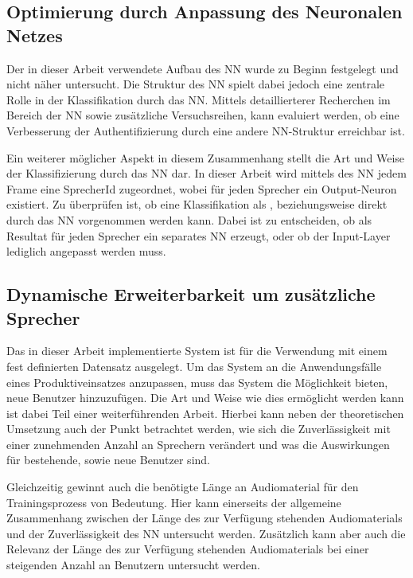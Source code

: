 \subsection{Optimierung durch Anpassung des Neuronalen Netzes}
Der in dieser Arbeit verwendete Aufbau des \ac{NN} wurde zu Beginn festgelegt und nicht näher untersucht.
Die Struktur des \ac{NN} spielt dabei jedoch eine zentrale Rolle in der Klassifikation durch das \ac{NN}.
Mittels detaillierterer Recherchen im Bereich der \ac{NN} sowie zusätzliche Versuchsreihen, kann evaluiert werden, ob eine Verbesserung der Authentifizierung durch eine andere \ac{NN}-Struktur erreichbar ist.

Ein weiterer möglicher Aspekt in diesem Zusammenhang stellt die Art und Weise der Klassifizierung durch das \ac{NN} dar.
In dieser Arbeit wird mittels des \ac{NN} jedem Frame eine SprecherId zugeordnet, wobei für jeden Sprecher ein Output-Neuron existiert.
Zu überprüfen ist, ob eine Klassifikation als , beziehungsweise  direkt durch das \ac{NN} vorgenommen werden kann.
Dabei ist zu entscheiden, ob als Resultat für jeden Sprecher ein separates \ac{NN} erzeugt, oder ob der Input-Layer lediglich angepasst werden muss.

\subsection{Dynamische Erweiterbarkeit um zusätzliche Sprecher}
Das in dieser Arbeit implementierte System ist für die Verwendung mit einem fest definierten Datensatz ausgelegt.
Um das System an die Anwendungsfälle eines Produktiveinsatzes anzupassen, muss das System die Möglichkeit bieten, neue Benutzer hinzuzufügen.
Die Art und Weise wie dies ermöglicht werden kann ist dabei Teil einer weiterführenden Arbeit.
Hierbei kann neben der theoretischen Umsetzung auch der Punkt betrachtet werden, wie sich die Zuverlässigkeit mit einer zunehmenden Anzahl an Sprechern verändert und was die Auswirkungen für bestehende, sowie neue Benutzer sind.

Gleichzeitig gewinnt auch die benötigte Länge an Audiomaterial für den Trainingsprozess von Bedeutung.
Hier kann einerseits der allgemeine Zusammenhang zwischen der Länge des zur Verfügung stehenden Audiomaterials und der Zuverlässigkeit des \ac{NN} untersucht werden.
Zusätzlich kann aber auch die Relevanz der Länge des zur Verfügung stehenden Audiomaterials bei einer steigenden Anzahl an Benutzern untersucht werden.

